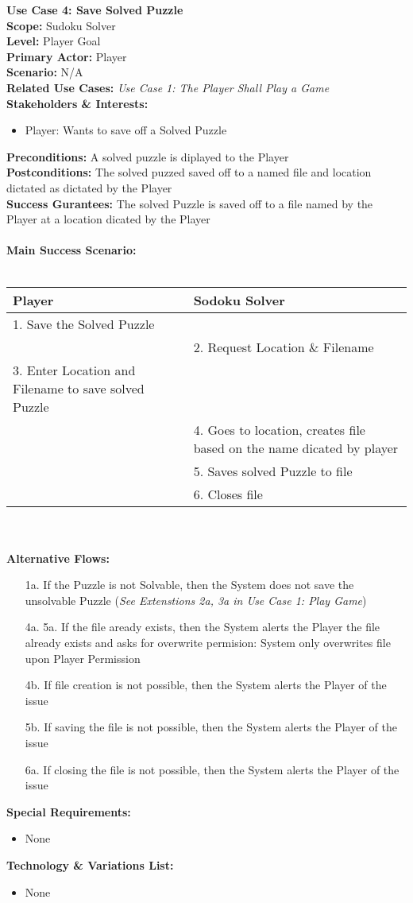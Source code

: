 \documentclass[letterpaper]{article}
\begin{document}
\noindent
\textbf{Use Case 4:  Save Solved Puzzle}\\
\textbf{Scope:  }Sudoku Solver\\
\textbf{Level:  }Player Goal\\
\textbf{Primary Actor:  }Player\\
\textbf{Scenario:  }N/A\\
\textbf{Related Use Cases:  }\textit{Use Case 1:  The Player Shall
Play a Game}\\
\textbf{Stakeholders \& Interests:}
\begin{itemize}
\item Player:  Wants to save off a Solved Puzzle
\end{itemize}
\textbf{Preconditions:  }A solved puzzle is diplayed to the Player\\
\textbf{Postconditions: }The solved puzzed saved off to a named file
and location dictated as dictated by the Player\\
\textbf{Success Gurantees:  }The solved Puzzle is saved off to a file
named by the Player at a location dicated by the Player\\\\
\textbf{Main Success Scenario:}\\\\
\begin{tabular}{|p{5.75cm}|p{5.75cm}|}\hline
\textbf{Player} & \textbf{Sodoku Solver}\\\hline
1.  Save the Solved Puzzle & \\\hline
& 2.  Request Location \& Filename\\\hline
3.  Enter Location and Filename to save solved Puzzle &\\\hline
& 4.  Goes to location, creates file based on the name dicated by
player\\\hline
& 5.  Saves solved Puzzle to file\\\hline
& 6.  Closes file\\\hline
\end{tabular}\\\\
\textbf{Alternative Flows:  }
\begin{itemize}
\item[1a.]If the Puzzle is not Solvable, then the System does not save
the unsolvable Puzzle (\textit{See Extenstions 2a, 3a in Use Case 1:
Play Game})
\item[4a. 5a.]If the file aready exists, then the System alerts the
Player the file already exists and asks for overwrite permision:
System only overwrites file upon Player Permission
\item[4b.]If file creation is not possible, then the System alerts the
Player of the issue
\item[5b.]If saving the file is not possible, then the System alerts
the Player of the issue
\item[6a.]If closing the file is not possible, then the System alerts
the Player of the issue
\end{itemize}
\textbf{Special Requirements:}
\begin{itemize}
\item None
\end{itemize}
\textbf{Technology \& Variations List:}
\begin{itemize}
\item None
\end{itemize}
\end{document}
